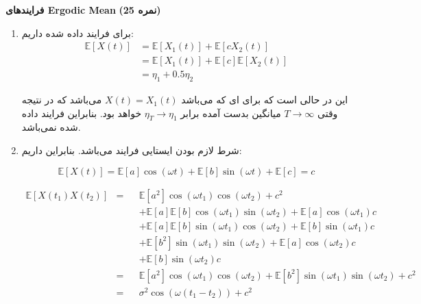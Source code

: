 \Large \textbf{فرایندهای Ergodic Mean}
\large \textbf{(25 نمره)}

\normalsize \vspace{0.5cm}

\begin{enumerate}
	\item
	برای فرایند داده شده داریم:
	$$
	\begin{aligned}
		\mathbb{E}\left[ {X\left( t \right)} \right] & = \mathbb{E}\left[ {{X_1}\left( t \right)} \right] + \mathbb{E}\left[ {c{X_2}\left( t \right)} \right]\\
		& = \mathbb{E}\left[ {{X_1}\left( t \right)} \right] + \mathbb{E}\left[ c \right]\mathbb{E}\left[ {{X_2}\left( t \right)} \right]\\
		& = {\eta _1} + 0.5{\eta _2}
	\end{aligned}
	$$
	
	این در حالی است که برای
	ای که
	می‌باشد
	$X\left( t \right) = {X_1}\left( t \right)$
	می‌باشد که در نتیجه وقتی
	$T \to \infty$
	میانگین بدست آمده برابر
	${\eta _T} \to {\eta _1}$
	خواهد بود. بنابراین فرایند داده شده
	نمی‌باشد.
	
	
	\item
	شرط لازم
	بودن ایستایی فرایند می‌باشد. بنابراین داریم:
	
	$$
	\mathbb{E}\left[ {X\left( t \right)} \right] = \mathbb{E}\left[ a \right]\cos \left( {\omega t} \right) + \mathbb{E}\left[ b \right]\sin \left( {\omega t} \right) + \mathbb{E}\left[ c \right] = c
	$$
	
	$$
	\begin{aligned}
		\mathbb{E}\left[ {X\left( {{t_1}} \right)X\left( {{t_2}} \right)} \right] & = && \mathbb{E}\left[ {{a^2}} \right]\cos \left( {\omega {t_1}} \right)\cos \left( {\omega {t_2}} \right) + {c^2}\\
		& && + \mathbb{E}\left[ a \right]\mathbb{E}\left[ b \right]\cos \left( {\omega {t_1}} \right)\sin \left( {\omega {t_2}} \right) + \mathbb{E}\left[ a \right]\cos \left( {\omega {t_1}} \right)c\\
		& && + \mathbb{E}\left[ a \right]\mathbb{E}\left[ b \right]\sin \left( {\omega {t_1}} \right)\cos \left( {\omega {t_2}} \right) + \mathbb{E}\left[ b \right]\sin \left( {\omega {t_1}} \right)c\\
		& && + \mathbb{E}\left[ {{b^2}} \right]\sin \left( {\omega {t_1}} \right)\sin \left( {\omega {t_2}} \right) + \mathbb{E}\left[ a \right]\cos \left( {\omega {t_2}} \right)c\\
		& && + \mathbb{E}\left[ b \right]\sin \left( {\omega {t_2}} \right)c\\
		& = && \mathbb{E}\left[ {{a^2}} \right]\cos \left( {\omega {t_1}} \right)\cos \left( {\omega {t_2}} \right) + \mathbb{E}\left[ {{b^2}} \right]\sin \left( {\omega {t_1}} \right)\sin \left( {\omega {t_2}} \right) + {c^2}\\
		& = && {\sigma ^2}\cos \left( {\omega \left( {{t_1} - {t_2}} \right)} \right) + {c^2}
	\end{aligned}
	$$
	

\end{enumerate}
